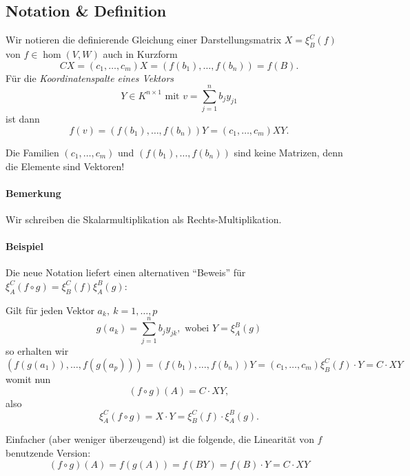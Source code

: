 \subsection{Notation \& Definition}
	\begin{Definition}
		Wir notieren die definierende Gleichung einer Darstellungsmatrix $ X=\xi_B^C(f) $ von $ f\in \hom(V,W) $ auch in Kurzform
		\[
			CX=(c_1,\dots,c_m)X = (f(b_1),\dots,f(b_n)) = f(B).
		\]
		Für die \emph{Koordinatenspalte eines Vektors}
		\[
			Y\in K^{n\times 1} \text{ mit } v=\sum_{j=1}^{n}b_jy_{j1}
		\]
		ist dann
		\[
			f(v) = (f(b_1),\dots,f(b_n))Y = (c_1,\dots,c_m)XY.
		\]
	\end{Definition}
	Die Familien $ (c_1,\dots,c_m) $ und $ (f(b_1),\dots,f(b_n)) $ sind keine Matrizen, denn die Elemente sind Vektoren!

	\paragraph{Bemerkung}
		Wir schreiben die Skalarmultiplikation als Rechts-Multiplikation.
	\paragraph{Beispiel}
		Die neue Notation liefert einen alternativen "`Beweis"' für $ \xi_A^C(f\circ g) = \xi_B^C(f)\xi_A^B(g) $:

		Gilt für jeden Vektor $ a_k,\ k=1,\dots,p $
		\[
			g(a_k) = \sum_{j=1}^{n}b_jy_{jk}, \text{ wobei } Y = \xi_A^B(g)
		\]
		so erhalten wir
		\[
			(f(g(a_1)),\dots, f(g(a_p))) = (f(b_1),\dots , f(b_n))Y = (c_1,\dots,c_m)\xi_B^C(f)\cdot Y = C\cdot XY
		\]
		womit nun
		\[
			(f\circ g)(A) = C\cdot XY,
		\]
		also
		\[
			\xi_A^C(f\circ g) = X\cdot Y = \xi_B^C(f)\cdot \xi_A^B(g).
		\]

		Einfacher (aber weniger überzeugend) ist die folgende, die Linearität von $ f $ benutzende Version:
		\[
			( f\circ g )(A) = f(g(A)) = f(BY) = f(B)\cdot Y = C\cdot XY
		\]
